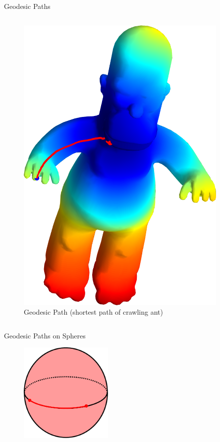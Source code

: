 \documentclass{beamer}
\begin{document}
\begin{frame}{Geodesic Paths}
\begin{columns}
{\begin{column}[T]{4cm}
\begin{figure}[t]
    \includegraphics[width=\textwidth]{FastMarching_Beard_LFinger.png}
    \caption*{Geodesic Path (shortest path of crawling ant)}
\end{figure}
\end{column}
}
\end{columns}

\end{frame}


\begin{frame}{Geodesic Paths on Spheres}

\begin{figure}[t]
    \includegraphics[width=0.4\textwidth]{SphereGeodesic.pdf}
\end{figure}

\end{frame}
\end{document}
